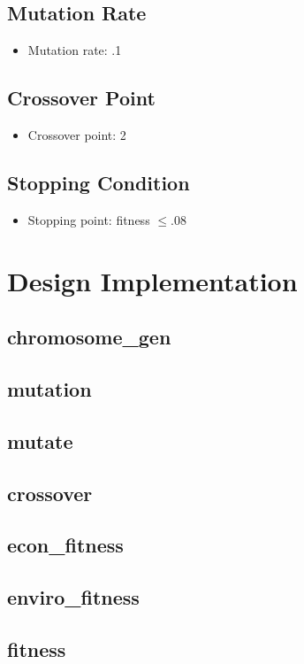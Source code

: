 \documentclass{article}
\begin{document}
    \subsection{Mutation Rate}
    \begin{itemize}
        \item Mutation rate: .1
    \end{itemize}
    \subsection{Crossover Point}
    \begin{itemize}
        \item Crossover point: 2
    \end{itemize}
    \subsection{Stopping Condition}
    \begin{itemize}
        \item Stopping point: fitness \(\leq .08\)
    \end{itemize}

\setcounter{section}{2}
\section{Design Implementation}
    \subsection{chromosome\_gen}
    \subsection{mutation}
    \subsection{mutate}
    \subsection{crossover}
    \subsection{econ\_fitness}
    \subsection{enviro\_fitness}
    \subsection{fitness}
\end{document}
